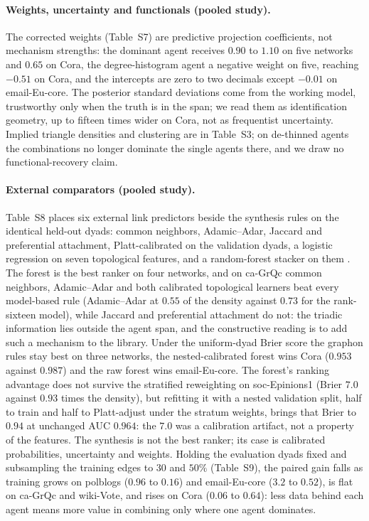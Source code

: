 \documentclass[12pt]{article}
\begin{document}
\paragraph{Weights, uncertainty and functionals (pooled study).}
The corrected weights (Table~S7) are predictive projection coefficients, not mechanism strengths: the dominant agent receives $0.90$ to $1.10$ on five networks and $0.65$ on Cora, the degree-histogram agent a negative weight on five, reaching $-0.51$ on Cora, and the intercepts are zero to two decimals except $-0.01$ on email-Eu-core. The posterior standard deviations come from the working model, trustworthy only when the truth is in the span; we read them as identification geometry, up to fifteen times wider on Cora, not as frequentist uncertainty. Implied triangle densities and clustering are in Table~S3; on de-thinned agents the combinations no longer dominate the single agents there, and we draw no functional-recovery claim.

\paragraph{External comparators (pooled study).}
Table~S8 places six external link predictors beside the synthesis rules on the identical held-out dyads: common neighbors, Adamic--Adar, Jaccard and preferential attachment, Platt-calibrated on the validation dyads, a logistic regression on seven topological features, and a random-forest stacker on them \citep{GhasemianEtAl2020}. The forest is the best ranker on four networks, and on ca-GrQc common neighbors, Adamic--Adar and both calibrated topological learners beat every model-based rule (Adamic--Adar at $0.55$ of the density against $0.73$ for the rank-sixteen model), while Jaccard and preferential attachment do not: the triadic information lies outside the agent span, and the constructive reading is to add such a mechanism to the library. Under the uniform-dyad Brier score the graphon rules stay best on three networks, the nested-calibrated forest wins Cora ($0.953$ against $0.987$) and the raw forest wins email-Eu-core. The forest's ranking advantage does not survive the stratified reweighting on soc-Epinions1 (Brier $7.0$ against $0.93$ times the density), but refitting it with a nested validation split, half to train and half to Platt-adjust under the stratum weights, brings that Brier to $0.94$ at unchanged AUC $0.964$: the $7.0$ was a calibration artifact, not a property of the features. The synthesis is not the best ranker; its case is calibrated probabilities, uncertainty and weights. Holding the evaluation dyads fixed and subsampling the training edges to $30$ and $50\%$ (Table~S9), the paired gain falls as training grows on polblogs ($0.96$ to $0.16$) and email-Eu-core ($3.2$ to $0.52$), is flat on ca-GrQc and wiki-Vote, and rises on Cora ($0.06$ to $0.64$): less data behind each agent means more value in combining only where one agent dominates.
\end{document}
